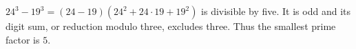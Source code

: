 $24^3-19^3=(24-19)(24^2+24\cdot19+19^2)$ is divisible by five. It is odd and its digit sum, or reduction modulo three, excludes three. Thus the smallest prime factor is $\boxed5$.
